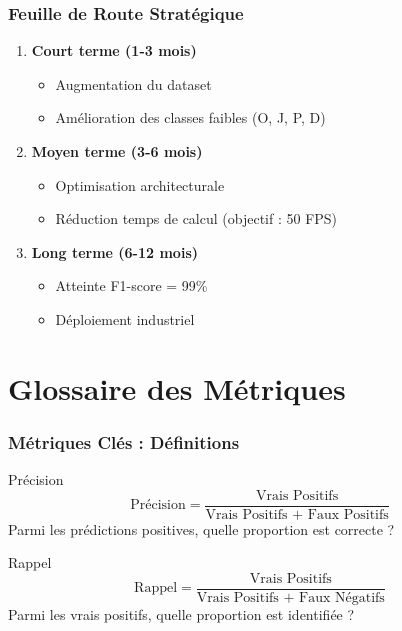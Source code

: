 \documentclass[
	11pt,
	aspectratio=169,
]{beamer}
\begin{document}
\begin{frame}
	\frametitle{Feuille de Route Stratégique}
	
	\begin{enumerate}
		\item \textbf{Court terme (1-3 mois)}
		\begin{itemize}
			\item Augmentation du dataset
			\item Amélioration des classes faibles (O, J, P, D)
		\end{itemize}
		
		\bigskip
		
		\item \textbf{Moyen terme (3-6 mois)}
		\begin{itemize}
			\item Optimisation architecturale
			\item Réduction temps de calcul (objectif : 50 FPS)
		\end{itemize}
		
		\bigskip
		
		\item \textbf{Long terme (6-12 mois)}
		\begin{itemize}
			\item Atteinte F1-score = 99\%
			\item Déploiement industriel
		\end{itemize}
	\end{enumerate}
\end{frame}


\section{Glossaire des Métriques}

\begin{frame}
	\frametitle{Métriques Clés : Définitions}
	
	\begin{block}{Précision}
		\begin{equation*}
			\text{Précision} = \frac{\text{Vrais Positifs}}{\text{Vrais Positifs + Faux Positifs}}
		\end{equation*}
		Parmi les prédictions positives, quelle proportion est correcte ?
	\end{block}
	
	\begin{block}{Rappel}
		\begin{equation*}
			\text{Rappel} = \frac{\text{Vrais Positifs}}{\text{Vrais Positifs + Faux Négatifs}}
		\end{equation*}
		Parmi les vrais positifs, quelle proportion est identifiée ?
	\end{block}
\end{frame}
\end{document}
